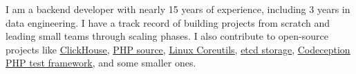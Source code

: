I am a backend developer with nearly 15 years of experience, including 3 years
in data engineering. I have a track record of building projects from scratch
and leading small teams through scaling phases. I also contribute to
open-source projects like
\href{https://github.com/ClickHouse/ClickHouse/pulls?q=is\%3Apr+is\%3Aclosed+author\%3AGSokol}{\underline{ClickHouse}},
\href{https://github.com/php/php-src/pulls?q=is\%3Apr+is\%3Aclosed+author\%3AGSokol}{\underline{PHP source}},
\href{https://github.com/coreutils/coreutils/commits?author=GSokol}{\underline{Linux Coreutils}},
\href{https://github.com/etcd-io/etcd/pulls?q=is\%3Apr+is\%3Aclosed+author\%3AGSokol}{\underline{etcd storage}},
\href{https://github.com/Codeception/Codeception/pulls?q=is\%3Apr+is\%3Aclosed+author\%3AGSokol}{\underline{Codeception PHP test framework}},
and some smaller ones.

